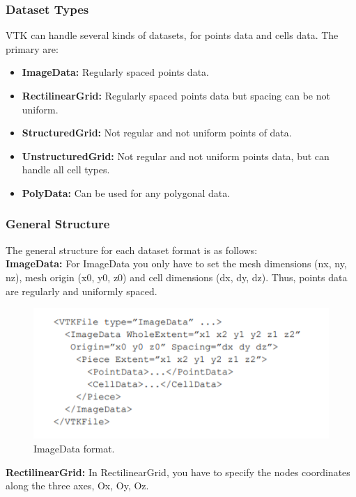\documentclass[onecolumn, draftclsnofoot,10pt, compsoc]{IEEEtran}
\begin{document}
\subsubsection{Dataset Types}
VTK can handle several kinds of datasets, for points data and cells data. The primary are:
\begin{itemize}
    \item \textbf{ImageData:} Regularly spaced points data.
    \item \textbf{RectilinearGrid:} Regularly spaced points data but spacing can be not uniform.
    \item \textbf{StructuredGrid:} Not regular and not uniform points of data.
    \item \textbf{UnstructuredGrid:} Not regular and not uniform points data, but can handle all cell types.
    \item \textbf{PolyData:} Can be used for any polygonal data.
\end{itemize}

\subsubsection{General Structure}
The general structure for each dataset format is as follows:\\

\noindent
\textbf{ImageData:} For ImageData you only have to set the mesh dimensions (nx, ny, nz), mesh origin (x0, y0, z0) and cell dimensions (dx, dy, dz). Thus, points data are regularly and uniformly spaced.

\begin{figure}[H]
\centering
\includegraphics{ImageData.png}
\caption{ImageData format.}
\label{fig:imagedata}
\end{figure}

\noindent
\textbf{RectilinearGrid:} In RectilinearGrid, you have to specify the nodes coordinates along the three axes, Ox, Oy, Oz.
\end{document}
